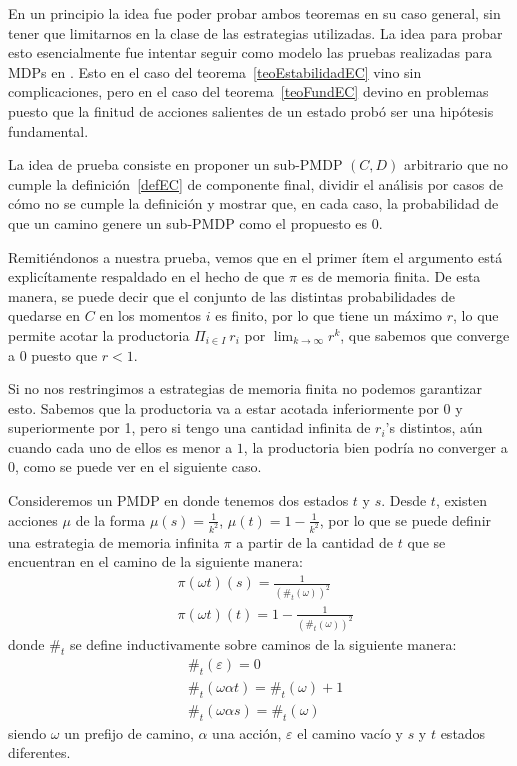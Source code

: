 En un principio la idea fue poder probar ambos teoremas en su caso general, sin
tener que limitarnos en la clase de las estrategias utilizadas. La idea para
probar esto esencialmente fue intentar seguir como modelo las pruebas
realizadas para MDPs en \cite{AlfaroThesis,BaierKatoen}. Esto en el caso del
teorema~\ref{teoEstabilidadEC} vino sin complicaciones, pero en el caso del
teorema~\ref{teoFundEC} devino en problemas puesto que la finitud de acciones
salientes de un estado probó ser una hipótesis fundamental.

La idea de prueba consiste en proponer un sub-PMDP $(C, D)$ arbitrario que no
cumple la definición~\ref{defEC} de componente final, dividir el análisis por
casos de cómo no se cumple la definición y mostrar que, en cada caso, la
probabilidad de que un camino genere un sub-PMDP como el propuesto es 0.

Remitiéndonos a nuestra prueba, vemos que en el primer ítem el argumento está
explicítamente respaldado en el hecho de que $\pi$ es de memoria finita. De
esta manera, se puede decir que el conjunto de las distintas probabilidades de
quedarse en $C$ en los momentos $i$ es finito, por lo que tiene un máximo $r$,
lo que permite acotar la productoria $\Pi_{i \in I} \ r_i$ por $\lim_{k \to
		\infty} r^k$, que sabemos que converge a 0 puesto que $r < 1$.

Si no nos restringimos a estrategias de memoria finita no podemos garantizar
esto. Sabemos que la productoria va a estar acotada inferiormente por 0 y
superiormente por 1, pero si tengo una cantidad infinita de $r_i$'s distintos,
aún cuando cada uno de ellos es menor a $1$, la productoria bien podría no
converger a $0$, como se puede ver en el siguiente caso.

Consideremos un PMDP en donde tenemos dos estados $t$ y $s$. Desde $t$, existen
acciones $\mu$ de la forma $\mu(s) = \frac{1}{k^2}$, $\mu(t) = 1 -
	\frac{1}{k^2}$, por lo que se puede definir una estrategia de memoria infinita
$\pi$ a partir de la cantidad de $t$ que se encuentran en el camino de la
siguiente manera:
\begin{align*}
	&\pi(\omega t)(s) = \frac{1}{(\#_t(\omega))^2} \\
	&\pi(\omega t)(t) = 1- \frac{1}{(\#_t(\omega))^2}
\end{align*}
donde $\#_t$ se define inductivamente sobre caminos de la siguiente manera:
\begin{align*}
	&\#_t(\varepsilon) = 0 \\
	&\#_t(\omega \alpha t) = \#_t(\omega) + 1 \\
	&\#_t(\omega \alpha s) = \#_t(\omega)
\end{align*}
siendo $\omega$ un prefijo de camino, $\alpha$ una acción, $\varepsilon$ el
camino vacío y $s$ y $t$ estados diferentes.

